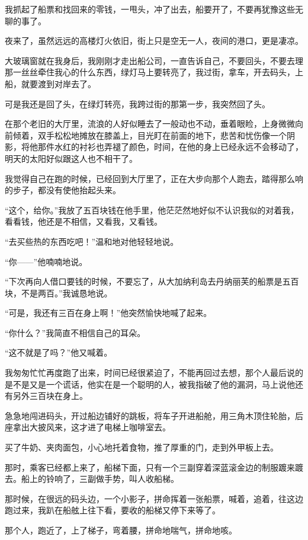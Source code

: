 \par 我抓起了船票和找回来的零钱，一甩头，冲了出去，船要开了，不要再犹豫这些无聊的事了。
\par 夜来了，虽然远远的高楼灯火依旧，街上只是空无一人，夜间的港口，更是凄凉。
\par 大玻璃窗就在我身后，我刚刚才走出船公司，一直告诉自己，不要回头，不要去理那一丝丝牵住我心的什么东西，绿灯马上要转亮了，我过街，拿车，开去码头，上船，就要渡到对岸去了。
\par 可是我还是回了头，在绿灯转亮，我跨过街的那第一步，我突然回了头。
\par 在那个老旧的大厅里，流浪的人好似睡去了一般动也不动，垂着眼睑，上身微微向前倾着，双手松松地摊放在膝盖上，目光盯在前面的地下，悲苦和忧伤像一个阴影，将他那件水红的衬衫也弄褪了颜色，时间，在他的身上已经永远不会移动了，明天的太阳好似跟这人也不相干了。
\par 我觉得自己在跑的时候，已经回到大厅里了，正在大步向那个人跑去，踏得那么响的步子，都没有使他抬起头来。
\par “这个，给你。”我放了五百块钱在他手里，他茫茫然地好似不认识我似的对着我，看看钱，他还是不相信，又看我，又看钱。
\par “去买些热的东西吃吧！”温和地对他轻轻地说。
\par “你——”他喃喃地说。
\par “下次再向人借口要钱的时候，不要忘了，从大加纳利岛去丹纳丽芙的船票是五百块，不是两百。”我诚恳地说。
\par “可是，我还有三百在身上啊！”他突然愉快地喊了起来。
\par “你什么？”我简直不相信自己的耳朵。
\par “这不就是了吗？”他又喊着。
\par 我匆匆忙忙再度跑了出来，时间已经很紧迫了，不能再回过去想，那个人最后说的是不是又是一个谎话，他实在是一个聪明的人，被我指破了他的漏洞，马上说他还有另外三百块在身上。
\par 急急地闯进码头，开过船边铺好的跳板，将车子开进船舱，用三角木顶住轮胎，后座拿出大披风来，这才进了电梯上咖啡室去。
\par 买了牛奶、夹肉面包，小心地托着食物，推了厚重的门，走到外甲板上去。
\par 那时，乘客已经都上来了，船梯下面，只有一个三副穿着深蓝滚金边的制服踱来踱去。船上的铃响了，三副做手势，叫人收船梯。
\par 那时候，在很远的码头边，一个小影子，拼命挥着一张船票，喊着，追着，往这边跑过来，我趴在船舷上往下看，要收的船梯又停下来等了。
\par 那个人，跑近了，上了梯子，弯着腰，拼命地喘气，拼命地咳。
